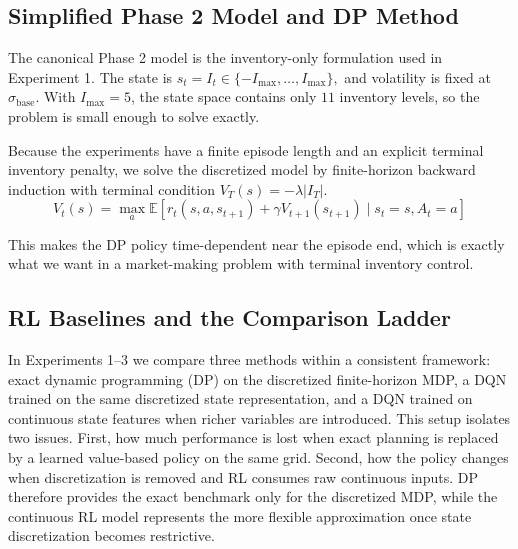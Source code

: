 \documentclass[11pt,a4paper]{article}
\begin{document}
\subsection{Simplified Phase 2 Model and DP Method}

The canonical Phase 2 model is the inventory-only formulation used in Experiment 1. The state is $    s_t = I_t \in \{-I_{\max}, \ldots, I_{\max}\},
$ and volatility is fixed at $\sigma_{\mathrm{base}}$. With $I_{\max}=5$, the state space contains only $11$ inventory levels, so the problem is small enough to solve exactly.

Because the experiments have a finite episode length and an explicit terminal inventory penalty, we solve the discretized model by finite-horizon backward induction with terminal condition $    V_T(s) = -\lambda |I_T|.$
\begin{equation}
    V_t(s) = \max_a \mathbb{E}\!\left[r_t(s,a,s_{t+1}) + \gamma V_{t+1}(s_{t+1}) \mid s_t=s, A_t=a \right]
\end{equation}

This makes the DP policy time-dependent near the episode end, which is exactly what we want in a market-making problem with terminal inventory control.

\subsection{RL Baselines and the Comparison Ladder}

In Experiments 1–3 we compare three methods within a consistent framework: exact dynamic programming (DP) on the discretized finite-horizon MDP, a DQN trained on the same discretized state representation, and a DQN trained on continuous state features when richer variables are introduced. This setup isolates two issues. First, how much performance is lost when exact planning is replaced by a learned value-based policy on the same grid. Second, how the policy changes when discretization is removed and RL consumes raw continuous inputs. DP therefore provides the exact benchmark only for the discretized MDP, while the continuous RL model represents the more flexible approximation once state discretization becomes restrictive.
\end{document}
